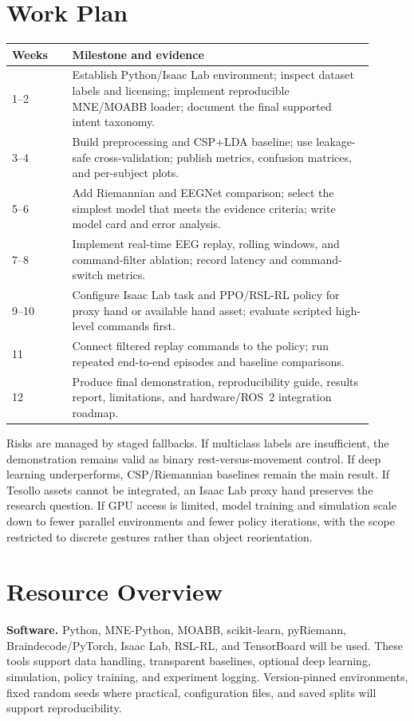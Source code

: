 \documentclass[11pt]{article}
\begin{document}
\section{Work Plan}
\begin{center}
\small
\begin{tabular}{p{0.15\linewidth}p{0.75\linewidth}}
\toprule
\textbf{Weeks} & \textbf{Milestone and evidence} \\
\midrule
1--2 & Establish Python/Isaac Lab environment; inspect dataset labels and licensing; implement reproducible MNE/MOABB loader; document the final supported intent taxonomy. \\
3--4 & Build preprocessing and CSP+LDA baseline; use leakage-safe cross-validation; publish metrics, confusion matrices, and per-subject plots. \\
5--6 & Add Riemannian and EEGNet comparison; select the simplest model that meets the evidence criteria; write model card and error analysis. \\
7--8 & Implement real-time EEG replay, rolling windows, and command-filter ablation; record latency and command-switch metrics. \\
9--10 & Configure Isaac Lab task and PPO/RSL-RL policy for proxy hand or available hand asset; evaluate scripted high-level commands first. \\
11 & Connect filtered replay commands to the policy; run repeated end-to-end episodes and baseline comparisons. \\
12 & Produce final demonstration, reproducibility guide, results report, limitations, and hardware/ROS~2 integration roadmap. \\
\bottomrule
\end{tabular}
\end{center}

Risks are managed by staged fallbacks. If multiclass labels are insufficient, the demonstration remains valid as binary rest-versus-movement control. If deep learning underperforms, CSP/Riemannian baselines remain the main result. If Tesollo assets cannot be integrated, an Isaac Lab proxy hand preserves the research question. If GPU access is limited, model training and simulation scale down to fewer parallel environments and fewer policy iterations, with the scope restricted to discrete gestures rather than object reorientation.

\section{Resource Overview}
\textbf{Software.} Python, MNE-Python, MOABB, scikit-learn, pyRiemann, Braindecode/PyTorch, Isaac Lab, RSL-RL, and TensorBoard will be used. These tools support data handling, transparent baselines, optional deep learning, simulation, policy training, and experiment logging. Version-pinned environments, fixed random seeds where practical, configuration files, and saved splits will support reproducibility.
\end{document}
